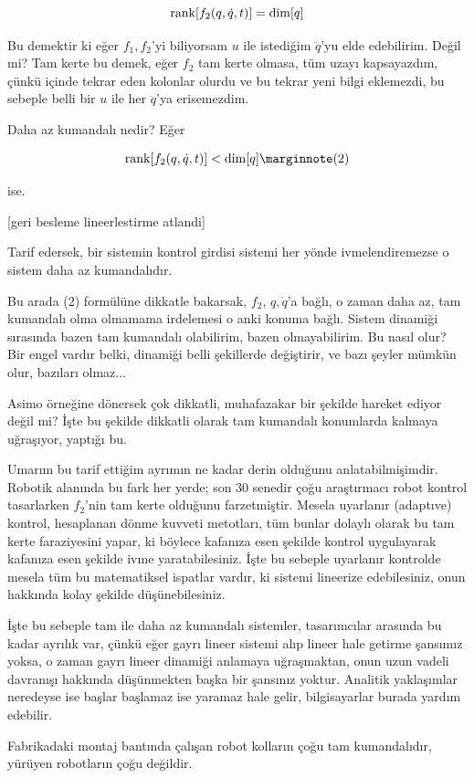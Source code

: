 \documentclass[12pt,fleqn]{article}\usepackage{../../common}
\begin{document}
$$
\operatorname{rank} [f_2(q,\dot{q},t)] = \operatorname{dim} [q]
$$

Bu demektir ki eğer $f_1,f_2$'yi biliyorsam $u$ ile istediğim $\ddot{q}$'yu
elde edebilirim. Değil mi? Tam kerte bu demek, eğer $f_2$ tam kerte olmasa,
tüm uzayı kapsayazdım, çünkü içinde tekrar eden kolonlar olurdu ve bu
tekrar yeni bilgi eklemezdi, bu sebeple belli bir $u$ ile her $\ddot{q}$'ya
erisemezdim.

Daha az kumandalı nedir? Eğer 

$$\rank [f_2(q,\dot{q},t)] < \ddim [q] 
\mlabel{2}$$ 

ise. 

[geri besleme lineerlestirme atlandi]

Tarif edersek, bir sistemin kontrol girdisi sistemi her yönde
ivmelendiremezse o sistem daha az kumandalıdır. 

Bu arada (2) formülüne dikkatle bakarsak, $f_2$, $q,\dot{q}$'a bağlı, o
zaman daha az, tam kumandalı olma olmamama irdelemesi o anki konuma
bağlı. Sistem dinamiği sırasında bazen tam kumandalı olabilirim, bazen
olmayabilirim. Bu nasıl olur? Bir engel vardır belki, dinamiği belli
şekillerde değiştirir, ve bazı şeyler mümkün olur, bazıları olmaz... 

Asimo örneğine dönersek çok dikkatli, muhafazakar bir şekilde hareket
ediyor değil mi? İşte bu şekilde dikkatli olarak tam kumandalı konumlarda
kalmaya uğraşıyor, yaptığı bu. 

Umarım bu tarif ettiğim ayrımın ne kadar derin olduğunu
anlatabilmişimdir. Robotik alanında bu fark her yerde; son 30 senedir çoğu
araştırmacı robot kontrol tasarlarken $f_2$'nin tam kerte olduğunu
farzetmiştir. Mesela uyarlanır (adaptıve) kontrol, hesaplanan dönme kuvveti
metotları, tüm bunlar dolaylı olarak bu tam kerte faraziyesini yapar, ki
böylece kafanıza esen şekilde kontrol uygulayarak kafanıza esen şekilde
ivme yaratabilesiniz.  İşte bu sebeple uyarlanır kontrolde mesela tüm bu
matematiksel ispatlar vardır, ki sistemi lineerize edebilesiniz, onun
hakkında kolay şekilde düşünebilesiniz.

İşte bu sebeple tam ile daha az kumandalı sistemler, tasarımcılar arasında
bu kadar ayrılık var, çünkü eğer gayrı lineer sistemi alıp lineer hale
getirme şansımız yoksa, o zaman gayrı lineer dinamiği anlamaya uğraşmaktan,
onun uzun vadeli davranışı hakkında düşünmekten başka bir şansınız
yoktur. Analitik yaklaşımlar neredeyse ise başlar başlamaz ise yaramaz hale
gelir, bilgisayarlar burada yardım edebilir.

Fabrikadaki montaj bantında çalışan robot kolların çoğu tam kumandalıdır,
yürüyen robotların çoğu değildir. 
\end{document}
